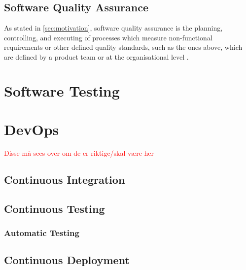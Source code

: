 \subsection{Software Quality Assurance}
As stated in \autoref{sec:motivation}, software quality assurance is the planning, controlling, and executing of processes which measure non-functional requirements or other defined quality standards, such as the ones above, which are defined by a product team or at the organisational level \cite{ieee_730_2014}\cite{sqa_wiki_2023}.

\section{Software Testing}

\section{DevOps}

\textcolor{red}{Disse må sees over om de er riktige/skal være her}
\subsection{Continuous Integration}

\subsection{Continuous Testing}

\subsubsection{Automatic Testing}


\subsection{Continuous Deployment}